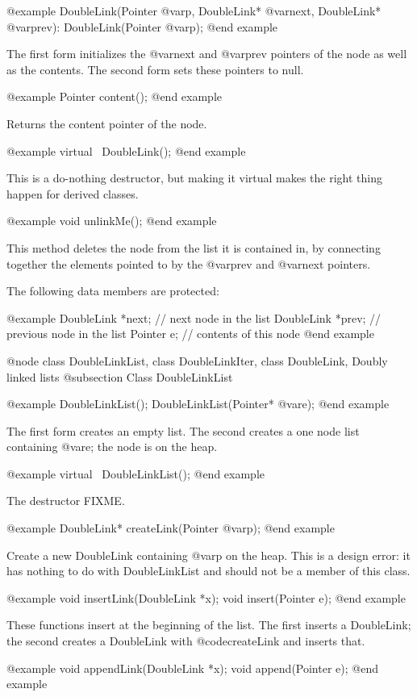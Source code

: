 @example
DoubleLink(Pointer @var{p}, DoubleLink* @var{next}, DoubleLink* @var{prev}):
DoubleLink(Pointer @var{p});
@end example

The first form initializes the @var{next} and @var{prev} pointers of the
node as well as the contents.  The second form sets these pointers to null.

@example
Pointer content();
@end example

Returns the content pointer of the node.

@example
virtual ~DoubleLink();
@end example

This is a do-nothing destructor, but making it virtual makes the right
thing happen for derived classes.

@example
void unlinkMe();
@end example

This method deletes the node from the list it is contained in, by
connecting together the elements pointed to by the @var{prev} and
@var{next} pointers.

The following data members are protected:

@example
DoubleLink *next; // next node in the list
DoubleLink *prev; // previous node in the list
Pointer e;        // contents of this node
@end example

@node class DoubleLinkList, class DoubleLinkIter, class DoubleLink, Doubly linked lists
@subsection Class DoubleLinkList

@example
DoubleLinkList();
DoubleLinkList(Pointer* @var{e});
@end example

The first form creates an empty list.  The second creates a one
node list containing @var{e}; the node is on the heap.

@example
virtual ~DoubleLinkList();
@end example

The destructor FIXME.

@example
DoubleLink* createLink(Pointer @var{p});
@end example

Create a new DoubleLink containing @var{p} on the heap.
This is a design error: it has nothing to do with DoubleLinkList
and should not be a member of this class.

@example
void insertLink(DoubleLink *x);
void insert(Pointer e);
@end example

These functions insert at the beginning of the list.  The first inserts
a DoubleLink; the second creates a DoubleLink with @code{createLink}
and inserts that.

@example
void appendLink(DoubleLink *x);
void append(Pointer e);
@end example

